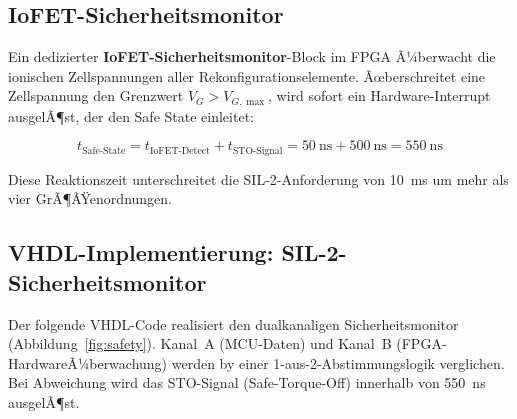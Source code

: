 ﻿\documentclass[a4paper,12pt]{scrreprt}
\theoremstyle{definition}
\begin{document}
\subsection{IoFET-Sicherheitsmonitor}

Ein dedizierter \textbf{IoFET-Sicherheitsmonitor}-Block im FPGA
Ã¼berwacht die ionischen Zellspannungen aller Rekonfigurationselemente.
Ãœberschreitet eine Zellspannung den Grenzwert $V_G > V_{G,\max}$,
wird sofort ein Hardware-Interrupt ausgelÃ¶st, der den Safe State
einleitet:

\begin{equation}
  t_{\text{Safe-State}} = t_{\text{IoFET-Detect}} + t_{\text{STO-Signal}}
  = \SI{50}{\nano\second} + \SI{500}{\nano\second}
  = \SI{550}{\nano\second}
\end{equation}

Diese Reaktionszeit unterschreitet die SIL-2-Anforderung von
\SI{10}{\milli\second} um mehr als vier GrÃ¶ÃŸenordnungen.

\subsection{VHDL-Implementierung: SIL-2-Sicherheitsmonitor}

Der folgende VHDL-Code realisiert den dualkanaligen Sicherheitsmonitor
(Abbildung~\ref{fig:safety}). Kanal~A (MCU-Daten) und Kanal~B
(FPGA-HardwareÃ¼berwachung) werden by einer 1-aus-2-Abstimmungslogik
verglichen. Bei Abweichung wird das STO-Signal (Safe-Torque-Off)
innerhalb von \SI{550}{\nano\second} ausgelÃ¶st.
\end{document}
